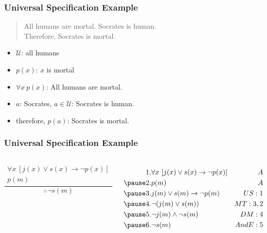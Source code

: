 \documentclass[dvipsnames]{beamer}
\begin{document}
\begin{frame}
  \frametitle{Universal Specification Example}

  \begin{example}
    \begin{quote}
      All humans are mortal. Socrates is human.\\
      Therefore, Socrates is mortal.
    \end{quote}

    \pause
    \begin{itemize}
      \item $\mathcal{U}$: all humans
      \item $p(x)$: $x$ is mortal
      \item $\forall x~p(x)$: All humans are mortal.
      \item $a$: Socrates, $a \in \mathcal{U}$: Socrates is human.
      \item therefore, $p(a)$: Socrates is mortal.
    \end{itemize}
  \end{example}
\end{frame}

\begin{frame}
  \frametitle{Universal Specification Example}

  \begin{example}
    \begin{columns}
      \[
      \frac
        {
          \begin{array}{c}
            \forall x~[j(x) \vee s(x) \rightarrow \neg p(x)]\\
            p(m)
          \end{array}
        }
        {
          \therefore \neg s(m)
        }
      \]

      \pause
      \begin{eqnarray*}
        1. & \forall x~[j(x) \vee s(x) \rightarrow \neg p(x)] & A\\\pause
        2. & p(m)                                             & A\\\pause
        3. & j(m) \vee s(m) \rightarrow \neg p(m)             & US:1\\\pause
        4. & \neg (j(m) \vee s(m))                            & MT:3,2\\\pause
        5. & \neg j(m) \wedge \neg s(m)                       & DM:4\\\pause
        6. & \neg s(m)                                        & AndE:5
      \end{eqnarray*}
    \end{columns}
  \end{example}
\end{frame}
\end{document}
